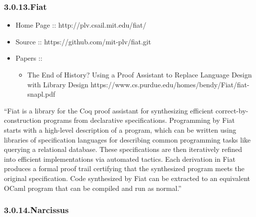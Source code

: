 \documentclass[12pt,twoside]{article}
\begin{document}
\subsubsection{3.0.13.\hspace*{0.5em}Fiat}\label{sec-fiat}%

\begin{itemize}[noitemsep,topsep=\mdcompacttopsep]%

\item{}Home Page :: http://plv.csail.mit.edu/fiat/%

\item{}Source :: https://github.com/mit-plv/fiat.git%

\item{}Papers ::

\begin{itemize}[noitemsep,topsep=\mdcompacttopsep]%

\item{}The End of History? Using a Proof Assistant to
Replace Language Design with Library Design
https://www.cs.purdue.edu/homes/bendy/Fiat/fiat-snapl.pdf%
\end{itemize}%
\end{itemize}%

\noindent{}\textquotedblleft{}Fiat is a library for the Coq proof assistant for synthesizing
efficient correct-by-construction programs from declarative
specifications. Programming by Fiat starts with a high-level
description of a program, which can be written using libraries of
specification languages for describing common programming tasks like
querying a relational database. These specifications are then
iteratively refined into efficient implementations via automated
tactics. Each derivation in Fiat produces a formal proof trail
certifying that the synthesized program meets the original
specification. Code synthesized by Fiat can be extracted to an
equivalent OCaml program that can be compiled and run as normal.\textquotedblright{}%

\subsubsection{3.0.14.\hspace*{0.5em}Narcissus}\label{sec-narcissus}%
\end{document}
